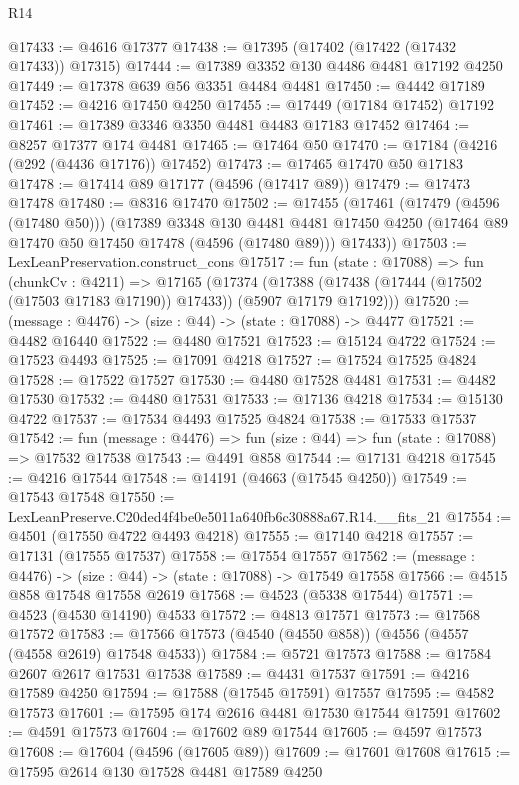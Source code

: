 \begin{lexlean}{R14}
\begin{coremodule}
@17433 := @4616 @17377
@17438 := @17395 (@17402 (@17422 (@17432 @17433)) @17315)
@17444 := @17389 @3352 @130 @4486 @4481 @17192 @4250
@17449 := @17378 @639 @56 @3351 @4484 @4481
@17450 := @4442 @17189
@17452 := @4216 @17450 @4250
@17455 := @17449 (@17184 @17452) @17192
@17461 := @17389 @3346 @3350 @4481 @4483 @17183 @17452
@17464 := @8257 @17377 @174 @4481
@17465 := @17464 @50
@17470 := @17184 (@4216 (@292 (@4436 @17176)) @17452)
@17473 := @17465 @17470 @50 @17183
@17478 := @17414 @89 @17177 (@4596 (@17417 @89))
@17479 := @17473 @17478
@17480 := @8316 @17470
@17502 := @17455
    (@17461
      (@17479 (@4596 (@17480 @50)))
      (@17389
        @3348
        @130
        @4481
        @4481
        @17450
        @4250
        (@17464 @89 @17470 @50 @17450 @17478 (@4596 (@17480 @89)))
        @17433))
@17503 := LexLeanPreservation.construct_cons
@17517 := fun (state : @17088) =>
  fun (chunkCv : @4211) =>
  @17165
    (@17374 (@17388 (@17438 (@17444 (@17502 (@17503 @17183 @17190)) @17433)) (@5907 @17179 @17192)))
@17520 := (message : @4476) -> (size : @44) -> (state : @17088) -> @4477
@17521 := @4482 @16440
@17522 := @4480 @17521
@17523 := @15124 @4722
@17524 := @17523 @4493
@17525 := @17091 @4218
@17527 := @17524 @17525 @4824
@17528 := @17522 @17527
@17530 := @4480 @17528 @4481
@17531 := @4482 @17530
@17532 := @4480 @17531
@17533 := @17136 @4218
@17534 := @15130 @4722
@17537 := @17534 @4493 @17525 @4824
@17538 := @17533 @17537
@17542 := fun (message : @4476) => fun (size : @44) => fun (state : @17088) => @17532 @17538
@17543 := @4491 @858
@17544 := @17131 @4218
@17545 := @4216 @17544
@17548 := @14191 (@4663 (@17545 @4250))
@17549 := @17543 @17548
@17550 := LexLeanPreserve.C20ded4f4be0e5011a640fb6c30888a67.R14.__fits_21
@17554 := @4501 (@17550 @4722 @4493 @4218)
@17555 := @17140 @4218
@17557 := @17131 (@17555 @17537)
@17558 := @17554 @17557
@17562 := (message : @4476) -> (size : @44) -> (state : @17088) -> @17549 @17558
@17566 := @4515 @858 @17548 @17558 @2619
@17568 := @4523 (@5338 @17544)
@17571 := @4523 (@4530 @14190) @4533
@17572 := @4813 @17571
@17573 := @17568 @17572
@17583 := @17566 @17573 (@4540 (@4550 @858)) (@4556 (@4557 (@4558 @2619) @17548 @4533))
@17584 := @5721 @17573
@17588 := @17584 @2607 @2617 @17531 @17538
@17589 := @4431 @17537
@17591 := @4216 @17589 @4250
@17594 := @17588 (@17545 @17591) @17557
@17595 := @4582 @17573
@17601 := @17595 @174 @2616 @4481 @17530 @17544 @17591
@17602 := @4591 @17573
@17604 := @17602 @89 @17544
@17605 := @4597 @17573
@17608 := @17604 (@4596 (@17605 @89))
@17609 := @17601 @17608
@17615 := @17595 @2614 @130 @17528 @4481 @17589 @4250

\end{coremodule}
\end{lexlean}
